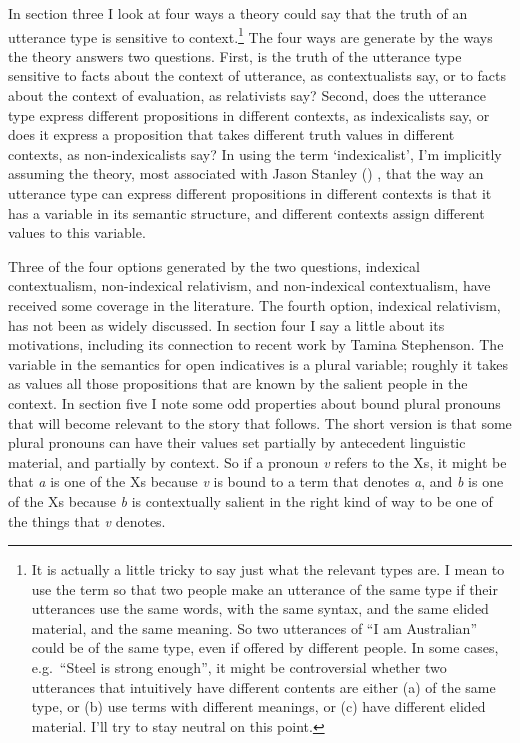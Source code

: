 \documentclass[
  10pt,
  letterpaper,
  DIV=11,
  numbers=noendperiod,
  twoside]{scrartcl}
\begin{document}
In section three I look at four ways a theory could say that the truth
of an utterance type is sensitive to context.\footnote{It is actually a
  little tricky to say just what the relevant types are. I mean to use
  the term so that two people make an utterance of the same type if
  their utterances use the same words, with the same syntax, and the
  same elided material, and the same meaning. So two utterances of ``I
  am Australian'' could be of the same type, even if offered by
  different people. In some cases, e.g.~``Steel is strong enough'', it
  might be controversial whether two utterances that intuitively have
  different contents are either (a) of the same type, or (b) use terms
  with different meanings, or (c) have different elided material. I'll
  try to stay neutral on this point.} The four ways are generate by the
ways the theory answers two questions. First, is the truth of the
utterance type sensitive to facts about the context of utterance, as
contextualists say, or to facts about the context of evaluation, as
relativists say? Second, does the utterance type express different
propositions in different contexts, as indexicalists say, or does it
express a proposition that takes different truth values in different
contexts, as non-indexicalists say? In using the term `indexicalist',
I'm implicitly assuming the theory, most associated with Jason Stanley
() , that the way an utterance
type can express different propositions in different contexts is that it
has a variable in its semantic structure, and different contexts assign
different values to this variable.

Three of the four options generated by the two questions, indexical
contextualism, non-indexical relativism, and non-indexical
contextualism, have received some coverage in the literature. The fourth
option, indexical relativism, has not been as widely discussed. In
section four I say a little about its motivations, including its
connection to recent work by Tamina Stephenson. The variable in the
semantics for open indicatives is a plural variable; roughly it takes as
values all those propositions that are known by the salient people in
the context. In section five I note some odd properties about bound
plural pronouns that will become relevant to the story that follows. The
short version is that some plural pronouns can have their values set
partially by antecedent linguistic material, and partially by context.
So if a pronoun \emph{v} refers to the Xs, it might be that \emph{a} is
one of the Xs because \emph{v} is bound to a term that denotes \emph{a},
and \emph{b} is one of the Xs because \emph{b} is contextually salient
in the right kind of way to be one of the things that \emph{v} denotes.
\end{document}
